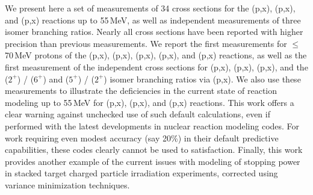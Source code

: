 We present here a set of measurements of 34 cross sections for the (p,x), (p,x), and  (p,x) reactions up to 55\,MeV, as well as  independent measurements of three isomer branching ratios.
Nearly all cross sections have been reported with higher precision than previous measurements.
We report the first measurements  for $\leq$70\,MeV protons  of the  (p,x), (p,x), (p,x),  (p,x), and (p,x) reactions, as well as the first measurement of the independent cross sections for    (p,x), (p,x), (p,x), and the  ($2^+$) /   ($6^+$) and  ($5^+$) /   ($2^+$)  isomer branching ratios via (p,x).
We also use these measurements to illustrate the deficiencies in the current state of  reaction modeling up to 55\,MeV for  (p,x), (p,x), and  (p,x) reactions.
This work offers a clear warning against unchecked use of  such default calculations, even if performed with the latest developments in nuclear reaction modeling codes. 
For work requiring even modest accuracy (say 20\%) in their default predictive capabilities, these codes clearly cannot be used to satisfaction.   
Finally, this work provides another example of the current issues with modeling of  stopping power in stacked target charged particle irradiation experiments, corrected using variance minimization techniques.  



